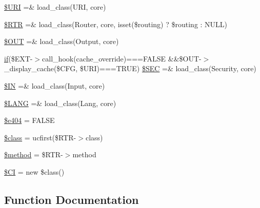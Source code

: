 \begin{DoxyCompactItemize}
\hyperlink{_code_igniter_8php_a630d83d898b39ad4568906284f7f5336}{\$\+U\+R\+I} =\& load\+\_\+class(\textquotesingle{}U\+R\+I\textquotesingle{}, \textquotesingle{}core\textquotesingle{})
\item 
\hyperlink{_code_igniter_8php_a4d6c9285c8483e4708a57a4128fc95f3}{\$\+R\+T\+R} =\& load\+\_\+class(\textquotesingle{}Router\textquotesingle{}, \textquotesingle{}core\textquotesingle{}, isset(\$routing) ? \$routing \+: N\+U\+L\+L)
\item 
\hyperlink{_code_igniter_8php_ad437402616c81c82c746f09854b23729}{\$\+O\+U\+T} =\& load\+\_\+class(\textquotesingle{}Output\textquotesingle{}, \textquotesingle{}core\textquotesingle{})
\item 
\hyperlink{excanvas_8js_a409038cddd5fb941140f7ff76f5b7b15}{if}(\$E\+X\+T-\/$>$call\+\_\+hook(\textquotesingle{}cache\+\_\+override\textquotesingle{})===F\+A\+L\+S\+E \&\&\$O\+U\+T-\/$>$\+\_\+display\+\_\+cache(\$C\+F\+G, \$U\+R\+I)===T\+R\+U\+E) \hyperlink{_code_igniter_8php_af78ce53fb82103e1165678dd2d3385a4}{\$\+S\+E\+C} =\& load\+\_\+class(\textquotesingle{}Security\textquotesingle{}, \textquotesingle{}core\textquotesingle{})
\item 
\hyperlink{_code_igniter_8php_a66d076d48aff75a01bb726f5bdd94d46}{\$\+I\+N} =\& load\+\_\+class(\textquotesingle{}Input\textquotesingle{}, \textquotesingle{}core\textquotesingle{})
\item 
\hyperlink{_code_igniter_8php_afab4eb732acc05cebf41e0afce18681c}{\$\+L\+A\+N\+G} =\& load\+\_\+class(\textquotesingle{}Lang\textquotesingle{}, \textquotesingle{}core\textquotesingle{})
\item 
\hyperlink{_code_igniter_8php_a20b89fa011927fc498a4a665fa44d061}{\$e404} = F\+A\+L\+S\+E
\item 
\hyperlink{_code_igniter_8php_a252ba022809910ea710a068fc1bab657}{\$class} = ucfirst(\$R\+T\+R-\/$>$class)
\item 
\hyperlink{_code_igniter_8php_a12661b2fc0f57f97e30a1620889ce9c6}{\$method} = \$R\+T\+R-\/$>$method
\item 
\hyperlink{_code_igniter_8php_ae0314d046ddf7fcfaec03222977427d3}{\$\+C\+I} = new \$class()
\end{DoxyCompactItemize}


\subsection{Function Documentation}
\hypertarget{_code_igniter_8php_a185483844bd20a0e80955460d66d2199}{}
